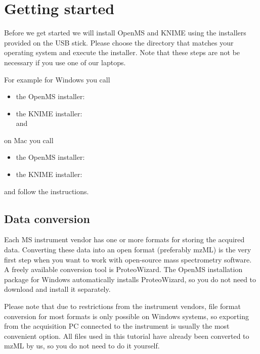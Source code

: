 
\setcounter{equation}{0}

\section{Getting started}

Before we get started we will install OpenMS and KNIME using the installers provided on the USB stick. Please choose the directory that matches your operating system and execute the installer. Note that these steps are not be necessary if you use one of our laptops.

For example for Windows you call
\begin{itemize}
\item the OpenMS installer: 
\item the KNIME installer:  \\ and 
\end{itemize}

on Mac you call
\begin{itemize}
\item the OpenMS installer: 
\item the KNIME installer: 
\end{itemize}

and follow the instructions.

\subsection{Data conversion}
\label{Data_Conversion}

Each MS instrument vendor has one or more formats for storing the acquired data. Converting these data into an open format (preferably mzML) is the very first step when you want to work with open-source mass spectrometry software. A freely available conversion tool is ProteoWizard. The OpenMS installation package for Windows automatically installs ProteoWizard, so you do not need to download and install it separately.

Please note that due to restrictions from the instrument vendors, file format conversion for most formats is only possible on Windows systems, so exporting from the acquisition PC connected to the instrument is usually the most convenient option.
All files used in this tutorial have already been converted to mzML by us, so you do not need to do it yourself.

